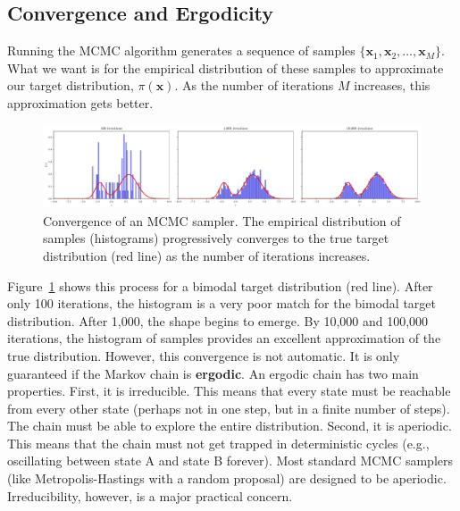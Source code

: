 \subsection{Convergence and Ergodicity}
Running the MCMC algorithm generates a sequence of samples $\{\mathbf{x}_1, \mathbf{x}_2, \ldots, \mathbf{x}_M\}$. What we want is for the empirical distribution of these samples to approximate our target distribution, $\pi(\mathbf{x})$. As the number of iterations $M$ increases, this approximation gets better.
\begin{figure}[htbp]
    \centering
    \includegraphics[width=\textwidth]{./figs/monte-carlo/mcmc_convergence.pdf}
    \caption{Convergence of an MCMC sampler. The empirical distribution of samples (histograms) progressively converges to the true target distribution (red line) as the number of iterations increases.}
    \label{fig:mcmc-convergence}
\end{figure}
Figure~\ref{fig:mcmc-convergence} shows this process for a bimodal target distribution (red line). After only 100 iterations, the histogram is a very poor match for the bimodal target distribution. After 1,000, the shape begins to emerge. By 10,000 and 100,000 iterations, the histogram of samples provides an excellent approximation of the true distribution. However, this convergence is not automatic. It is only guaranteed if the Markov chain is \textbf{ergodic}. An ergodic chain has two main properties. First, it is irreducible. This means that every state must be reachable from every other state (perhaps not in one step, but in a finite number of steps). The chain must be able to explore the entire distribution. Second, it is aperiodic. This means that the chain must not get trapped in deterministic cycles (e.g., oscillating between state A and state B forever). Most standard MCMC samplers (like Metropolis-Hastings with a random proposal) are designed to be aperiodic. Irreducibility, however, is a major practical concern.

